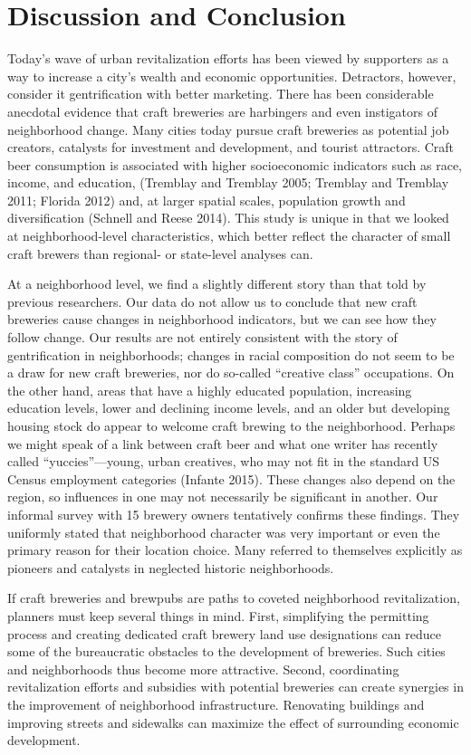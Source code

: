 \documentclass[]{article}
\begin{document}
\section{Discussion and Conclusion}\label{discussion-and-conclusion}

Today's wave of urban revitalization efforts has been viewed by
supporters as a way to increase a city's wealth and economic
opportunities. Detractors, however, consider it gentrification with
better marketing. There has been considerable anecdotal evidence that
craft breweries are harbingers and even instigators of neighborhood
change. Many cities today pursue craft breweries as potential job
creators, catalysts for investment and development, and tourist
attractors. Craft beer consumption is associated with higher
socioeconomic indicators such as race, income, and education, (Tremblay
and Tremblay 2005; Tremblay and Tremblay 2011; Florida 2012) and, at
larger spatial scales, population growth and diversification (Schnell
and Reese 2014). This study is unique in that we looked at
neighborhood-level characteristics, which better reflect the character
of small craft brewers than regional- or state-level analyses can.

At a neighborhood level, we find a slightly different story than that
told by previous researchers. Our data do not allow us to conclude that
new craft breweries cause changes in neighborhood indicators, but we can
see how they follow change. Our results are not entirely consistent with
the story of gentrification in neighborhoods; changes in racial
composition do not seem to be a draw for new craft breweries, nor do
so-called ``creative class'' occupations. On the other hand, areas that
have a highly educated population, increasing education levels, lower
and declining income levels, and an older but developing housing stock
do appear to welcome craft brewing to the neighborhood. Perhaps we might
speak of a link between craft beer and what one writer has recently
called ``yuccies''---young, urban creatives, who may not fit in the
standard US Census employment categories (Infante 2015). These changes
also depend on the region, so influences in one may not necessarily be
significant in another. Our informal survey with 15 brewery owners
tentatively confirms these findings. They uniformly stated that
neighborhood character was very important or even the primary reason for
their location choice. Many referred to themselves explicitly as
pioneers and catalysts in neglected historic neighborhoods.

If craft breweries and brewpubs are paths to coveted neighborhood
revitalization, planners must keep several things in mind. First,
simplifying the permitting process and creating dedicated craft brewery
land use designations can reduce some of the bureaucratic obstacles to
the development of breweries. Such cities and neighborhoods thus become
more attractive. Second, coordinating revitalization efforts and
subsidies with potential breweries can create synergies in the
improvement of neighborhood infrastructure. Renovating buildings and
improving streets and sidewalks can maximize the effect of surrounding
economic development.
\end{document}
